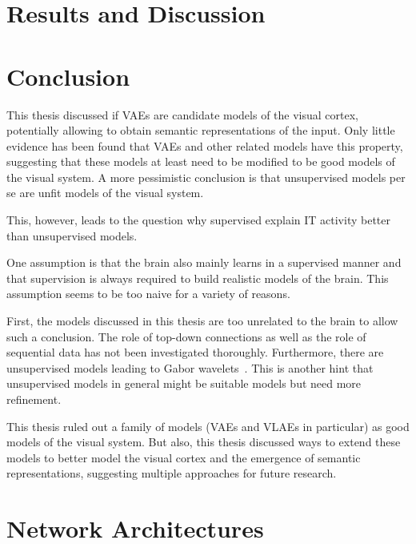 \documentclass[11pt,a4paper]{article}
\let\oldsection\section
\renewcommand\section{\clearpage\oldsection}
\newcounter{savepage}
\begin{document}
\section{Results and Discussion}\label{sec:results}


\acresetall
\section{Conclusion}\label{sec:conclusion}

This thesis discussed if \acfp{VAE} are candidate models of the visual cortex, potentially allowing to obtain semantic representations of the input.
Only little evidence has been found that \acp{VAE} and other related models have this property, suggesting that these models at least need to be modified to be good models of the visual system.
A more pessimistic conclusion is that unsupervised models per se are unfit models of the visual system.

This, however, leads to the question why supervised explain \ac{IT} activity better than unsupervised models.

One assumption is that the brain also mainly learns in a supervised manner and that supervision is always required to build realistic models of the brain.
This assumption seems to be too naive for a variety of reasons.

First, the models discussed in this thesis are too unrelated to the brain to allow such a conclusion.
The role of top-down connections as well as the role of sequential data has not been investigated thoroughly.
Furthermore, there are unsupervised models leading to Gabor wavelets~\citep{berkes2005slow}.
This is another hint that unsupervised models in general might be suitable models but need more refinement.

This thesis ruled out a family of models (\acp{VAE} and \acp{VLAE} in particular) as good models of the visual system.
But also, this thesis discussed ways to extend these models to better model the visual cortex and the emergence of semantic representations, suggesting multiple approaches for future research.

\newpage
\printbibliography

\newpage
{}
\setcounter{page}{\thesavepage}

\appendix


\section{Network Architectures}\label{sec:appendix_network_architectures}
\end{document}
